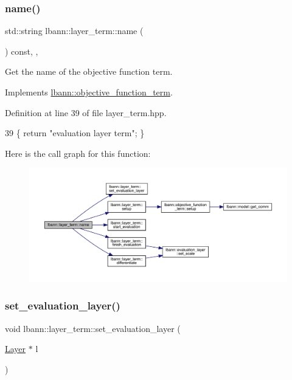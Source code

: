 \subsubsection{\texorpdfstring{name()}{name()}}
{\footnotesize\ttfamily std\+::string lbann\+::layer\+\_\+term\+::name (\begin{DoxyParamCaption}{ }\end{DoxyParamCaption}) const\hspace{0.3cm}{\ttfamily [inline]}, {\ttfamily [override]}, {\ttfamily [virtual]}}

Get the name of the objective function term. 

Implements \hyperlink{classlbann_1_1objective__function__term_a964fbfad3dd0434aa8f32c5fedf1079a}{lbann\+::objective\+\_\+function\+\_\+term}.



Definition at line 39 of file layer\+\_\+term.\+hpp.


\begin{DoxyCode}
39 \{ \textcolor{keywordflow}{return} \textcolor{stringliteral}{"evaluation layer term"}; \}
\end{DoxyCode}
Here is the call graph for this function\+:\nopagebreak
\begin{figure}[H]
\begin{center}
\leavevmode
\includegraphics[width=350pt]{classlbann_1_1layer__term_a4942422215408e724e68b5df8b20b715_cgraph}
\end{center}
\end{figure}
\mbox{\label{classlbann_1_1layer__term_a04ca36543288fb9c55ab99cc0cc2a648}} 
\subsubsection{\texorpdfstring{set\+\_\+evaluation\+\_\+layer()}{set\_evaluation\_layer()}}
{\footnotesize\ttfamily void lbann\+::layer\+\_\+term\+::set\+\_\+evaluation\+\_\+layer (\begin{DoxyParamCaption}\item[{\hyperlink{classlbann_1_1Layer}{Layer} $\ast$}]{l }\end{DoxyParamCaption})}



